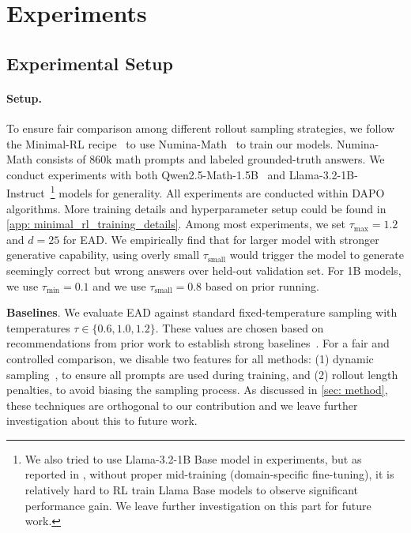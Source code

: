 \documentclass{article} %
\newcommand{\ych}[1]{\textcolor{purple}{[#1 -Chenghao]}}
\begin{document}
\section{Experiments}

\subsection{Experimental Setup}
\paragraph{Setup.} To ensure fair comparison among different rollout sampling strategies, we follow the Minimal-RL recipe~\citep{xiong2025minimalist} to use Numina-Math~\citep{numina_math_7b} to train our models. Numina-Math consists of 860k math prompts and labeled grounded-truth answers. We conduct experiments with both Qwen2.5-Math-1.5B~\citep{yang2024qwen2} and Llama-3.2-1B-Instruct~\citep{dubey2024llama}\footnote{We also tried to use Llama-3.2-1B Base model in experiments, but as reported in \citet{wang2025octothinker}, without proper mid-training (domain-specific fine-tuning), it is relatively hard to RL train Llama Base models to observe significant performance gain. We leave further investigation on this part for future work. } models for generality. All experiments are conducted within %
DAPO~\citep{yu2025dapo} algorithms. More training details and hyperparameter setup could be found in \cref{app: minimal_rl_training_details}. Among most experiments, we set $\tau_{\max}=1.2$ and $d=25$ for EAD. We empirically find that for larger model with stronger generative capability, using overly small $\tau_{\text{small}}$ would trigger the model to generate seemingly correct but wrong answers over held-out validation set. For 1B models, we use $\tau_{\min}=0.1$ and we use $\tau_{\text{small}}=0.8$ based on prior running. 

\textbf{Baselines}. We evaluate EAD against standard fixed-temperature sampling with temperatures $\tau \in \{0.6, 1.0, 1.2\}$. These values are chosen based on recommendations from prior work to establish strong baselines~\citep{renze-2024-effect, guo2025deepseek, hou2025t1}. 
For a fair and controlled comparison, we disable two features for all methods: (1) dynamic sampling~\citep{yu2025dapo}, to ensure all prompts are used during training, and (2) rollout length penalties, to avoid biasing the sampling process. As discussed in \cref{sec: method}, these techniques are orthogonal to our contribution and we leave further investigation about this to future work. 
\end{document}
